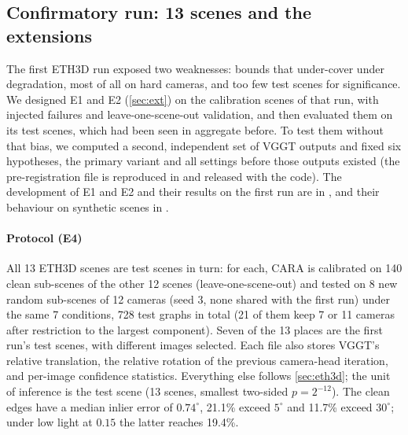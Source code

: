 \subsection{Confirmatory run: 13 scenes and the extensions}\label{sec:v2}
The first ETH3D run exposed two weaknesses: bounds that under-cover under degradation, most of all on hard cameras, and too few test scenes for significance. We designed E1 and E2 (\cref{sec:ext}) on the calibration scenes of that run, with injected failures and leave-one-scene-out validation, and then evaluated them on its test scenes, which had been seen in aggregate before. To test them without that bias, we computed a second, independent set of VGGT outputs and fixed six hypotheses, the primary variant and all settings before those outputs existed (the pre-registration file is reproduced in  and released with the code). The development of E1 and E2 and their results on the first run are in , and their behaviour on synthetic scenes in .

\paragraph*{Protocol (E4)} All 13 ETH3D scenes are test scenes in turn: for each, CARA is calibrated on 140 clean sub-scenes of the other 12 scenes (leave-one-scene-out) and tested on 8 new random sub-scenes of 12 cameras (seed 3, none shared with the first run) under the same 7 conditions, 728 test graphs in total (21 of them keep 7 or 11 cameras after restriction to the largest component). Seven of the 13 places are the first run's test scenes, with different images selected. Each file also stores VGGT's relative translation, the relative rotation of the previous camera-head iteration, and per-image confidence statistics. Everything else follows \cref{sec:eth3d}; the unit of inference is the test scene (13 scenes, smallest two-sided $p=2^{-12}$). The clean edges have a median inlier error of $0.74^\circ$, 21.1\% exceed $5^\circ$ and 11.7\% exceed $30^\circ$; under low light at $0.15$ the latter reaches 19.4\%.

